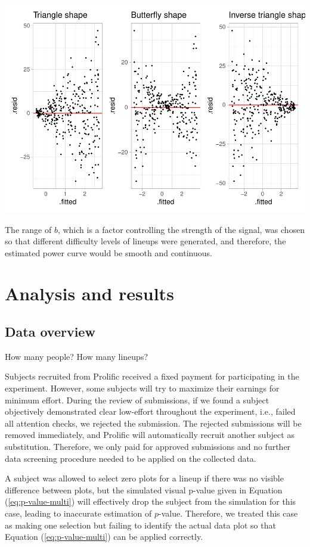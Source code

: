 \documentclass[]{interact}
\theoremstyle{plain}%
\theoremstyle{definition}
\theoremstyle{remark}
\begin{document}
\includegraphics{paper_comparison_files/figure-latex/different-shape-of-heter-1.pdf}

The range of \(b\), which is a factor controlling the strength of the
signal, was chosen so that different difficulty levels of lineups were
generated, and therefore, the estimated power curve would be smooth and
continuous.

\hypertarget{analysis-and-results}{%
\section{Analysis and results}\label{analysis-and-results}}

\hypertarget{data-overview}{%
\subsection{Data overview}\label{data-overview}}

How many people? How many lineups?

Subjects recruited from Prolific received a fixed payment for
participating in the experiment. However, some subjects will try to
maximize their earnings for minimum effort. During the review of
submissions, if we found a subject objectively demonstrated clear
low-effort throughout the experiment, i.e., failed all attention checks,
we rejected the submission. The rejected submissions will be removed
immediately, and Prolific will automatically recruit another subject as
substitution. Therefore, we only paid for approved submissions and no
further data screening procedure needed to be applied on the collected
data.

A subject was allowed to select zero plots for a lineup if there was no
visible difference between plots, but the simulated visual p-value given
in Equation (\ref{eq:p-value-multi}) will effectively drop the subject
from the simulation for this case, leading to inaccurate estimation of
\(p\)-value. Therefore, we treated this case as making one selection but
failing to identify the actual data plot so that Equation
(\ref{eq:p-value-multi}) can be applied correctly.
\end{document}
